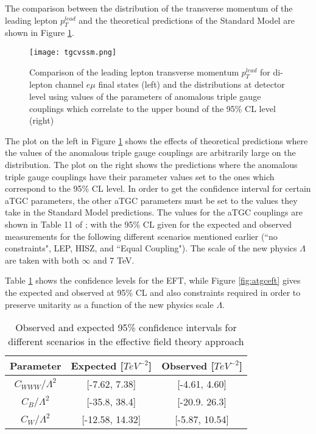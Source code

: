 \documentclass[11pt,oneside,a4paper]{article}
\begin{document}
The comparison between the distribution of the transverse momentum of the leading lepton $p^{lead}_{T}$ and the theoretical predictions of the Standard Model are shown in Figure \ref{fig:atgcvssm}.

\begin{figure}[H]
	\texttt{[image: tgcvssm.png]}
	\caption{Comparison of the leading lepton transverse momentum $p^{lead}_{T}$ for di-lepton channel $e\mu$ final states (left) and the distributions at detector level using values of the parameters of anomalous triple gauge couplings which correlate to the upper bound of the 95\% CL level (right)}
	\label{fig:atgcvssm}
\end{figure}

The plot on the left in Figure \ref{fig:atgcvssm} shows the effects of theoretical predictions where the values of the anomalous triple gauge couplings are arbitrarily large on the distribution. The plot on the right shows the predictions where the anomalous triple gauge couplings have their parameter values set to the ones which correspond to the 95\% CL level. In order to get the confidence interval for certain aTGC parameters, the other aTGC parameters must be set to the values they take in the Standard Model predictions. The values for the aTGC couplings are shown in Table 11 of \cite{WWtgc}; with the 95\% CL given for the expected and observed measurements for the following different scenarios mentioned earlier (``no constraints", LEP, HISZ, and ``Equal Coupling"). The scale of the new physics $\Lambda$ are taken with both $\infty$ and 7 TeV.  

Table \ref{table:atgccl} shows the confidence levels for the EFT, while Figure \ref{fig:atgceft} gives the expected and observed at 95\% CL and also constraints required in order to preserve unitarity as a function of the new physics scale $\Lambda$. 

\begin{table}[h!]
	\begin{center}
		\begin{tabular}{|| c | c | c ||} 
			\hline
			Parameter  &  Expected [$TeV^{-2}$] & Observed [$TeV^{-2}$] \\ [0.5ex] 
			\hline\hline
			$C_{WWW}/\Lambda^{2}$ & [-7.62, 7.38]  & [-4.61, 4.60]\\
		    $C_{B}/\Lambda^{2}$ & [-35.8, 38.4]  & [-20.9. 26.3] \\ 
		    $C_{W}/\Lambda^{2}$ & [-12.58, 14.32] & [-5.87, 10.54]\\ 	[1 ex] 
			\hline
		\end{tabular}
		\caption{Observed  and expected 95\% confidence intervals for different scenarios in the effective field theory approach}
		\label{table:atgccl}
	\end{center}
\end{table}
\end{document}
